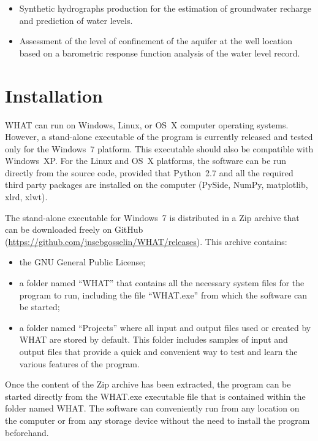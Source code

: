 \documentclass[WHATMANUAL.tex]{subfiles}
\begin{document}
\begin{itemize}

\item Synthetic hydrographs production for the estimation of groundwater recharge and prediction of water levels.

\item Assessment of the level of confinement of the aquifer at the well location based on a barometric response function analysis of the water level record.

\end{itemize}

\section{Installation}\label{sec:intallation}

WHAT can run on Windows, Linux, or OS~X computer operating systems. However, a stand-alone executable of the program is currently released and tested only for the Windows~7 platform. This executable should also be compatible with Windows~XP. For the Linux and OS~X platforms, the software can be run directly from the source code, provided that Python~2.7 and all the required third party packages are installed on the computer (PySide, NumPy, matplotlib, xlrd, xlwt).

The stand-alone executable for Windows~7 is distributed in a Zip archive that can be downloaded freely on GitHub (\url{https://github.com/jnsebgosselin/WHAT/releases}). This archive contains:

\begin{itemize}

\item the GNU General Public License;

\item a folder named ``WHAT'' that contains all the necessary system files for the program to run, including the file ``WHAT.exe'' from which the software can be started;

\item a folder named ``Projects'' where all input and output files used or created by WHAT are stored by default. This folder includes samples of input and output files that provide a quick and convenient way to test and learn the various features of the program.

\end{itemize}

Once the content of the Zip archive has been extracted, the program can be started directly from the WHAT.exe executable file that is contained within the folder named WHAT. The software can conveniently run from any location on the computer or from any storage device without the need to install the program beforehand.
\end{document}
